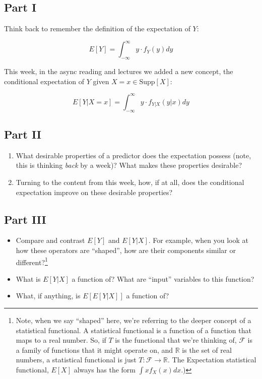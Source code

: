 \documentclass[
  letterpaper,
  DIV=11,
  numbers=noendperiod]{scrreprt}
\providecommand{\tightlist}{%
  \setlength{\itemsep}{0pt}\setlength{\parskip}{0pt}}\usepackage{longtable,booktabs,array}
\begin{document}
\subsection{Part I}\label{part-i}

Think back to remember the definition of the expectation of \(Y\):

\[
  E[Y] = \int_{-\infty}^\infty y \cdot f_{Y}(y) dy
\]

This week, in the async reading and lectures we added a new concept, the
conditional expectation of \(Y\) given \(X=x \in \text{Supp}[X]\):

\[
  E[Y|X=x] =  \int_{-\infty}^\infty y \cdot f_{Y|X}(y|x) dy
\]

\subsection{Part II}\label{part-ii}

\begin{enumerate}
\def\labelenumi{\arabic{enumi}.}
\tightlist
\item
  What desirable properties of a predictor does the expectation possess
  (note, this is thinking \emph{back} by a week)? What makes these
  properties desirable?
\item
  Turning to the content from this week, how, if at all, does the
  conditional expectation improve on these desirable properties?
\end{enumerate}

\subsection{Part III}\label{part-iii}

\begin{itemize}
\item
  Compare and contrast \(E[Y]\) and \(E[Y|X]\). For example, when you
  look at how these operators are ``shaped'', how are their components
  similar or different?\footnote{Note, when we say ``shaped'' here,
    we're referring to the deeper concept of a statistical functional. A
    statistical functional is a function of a function that maps to a
    real number. So, if \(T\) is the functional that we're thinking of,
    \(\mathcal{F}\) is a family of functions that it might operate on,
    and \(\mathbb{R}\) is the set of real numbers, a statistical
    functional is just \(T: \mathcal{F} \rightarrow \mathbb{R}\). The
    Expectation statistical functional, \(E[X]\) always has the form
    \(\int x f_{X}(x)dx\).)}
\item
  What is \(E[Y|X]\) a function of? What are ``input'' variables to this
  function?
\item
  What, if anything, is \(E[E[Y|X]]\) a function of?
\end{itemize}
\end{document}
